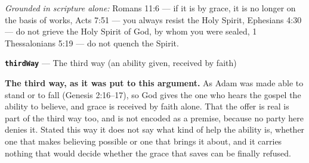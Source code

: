 \documentclass[11pt]{article}
\begin{document}
\emph{Grounded in scripture alone:} Romans 11:6 — if it is by grace, it is no longer on the basis of works, Acts 7:51 — you always resist the Holy Spirit, Ephesians 4:30 — do not grieve the Holy Spirit of God, by whom you were sealed, 1 Thessalonians 5:19 — do not quench the Spirit.
\par\medskip\noindent\textbf{\texttt{third\allowbreak{}Way}} --- The third way (an ability given, received by faith)\par\nobreak\noindent
\textbf{The third way, as it was put to this argument.} As Adam was made able to stand or to fall (Genesis 2:16–17), so God gives the one who hears the gospel the ability to believe, and grace is received by faith alone. That the offer is real is part of the third way too, and is not encoded as a premise, because no party here denies it. Stated this way it does not say what kind of help the ability is, whether one that makes believing possible or one that brings it about, and it carries nothing that would decide whether the grace that saves can be finally refused.
\end{document}
